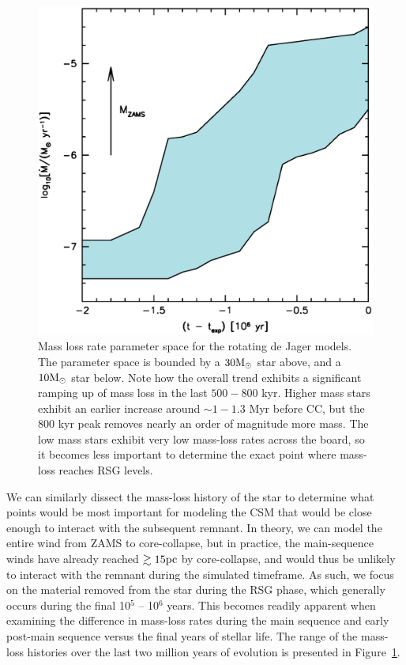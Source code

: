 \documentclass[twocolumn]{aastex631}
\begin{document}
\begin{figure}[htb!]
    \centering
    \includegraphics[scale=0.42]{mass-loss.eps}
    \caption{Mass loss rate parameter space for the rotating de Jager models. The parameter space is bounded by a $30 \rm M_{\odot}$ star above, and a $10 \rm M_{\odot}$ star below. Note how the overall trend exhibits a significant ramping up of mass loss in the last $500-800$ kyr. Higher mass stars exhibit an earlier increase around $\sim1-1.3$ Myr before CC, but the $800$ kyr peak removes nearly an order of magnitude more mass. The low mass stars exhibit very low mass-loss rates across the board, so it becomes less important to determine the exact point where mass-loss reaches RSG levels.}
    \label{fig:mass-loss}
\end{figure}

We can similarly dissect the mass-loss history of the star to determine what points would be most important for modeling the CSM that would be close enough to interact with the subsequent remnant.  In theory, we can model the entire wind from ZAMS to core-collapse, but in practice, the main-sequence winds have already reached $\gtrsim 15 \rm pc$ by core-collapse, and would thus be unlikely to interact with the remnant during the simulated timeframe. As such, we focus on the material removed from the star during the RSG phase, which generally occurs during the final 10$^5$ -- 10$^6$ years. This becomes readily apparent when examining the difference in mass-loss rates during the main sequence and early post-main sequence versus the final years of stellar life. The range of the mass-loss histories over the last two million years of evolution is presented in Figure~\ref{fig:mass-loss}.
\end{document}
